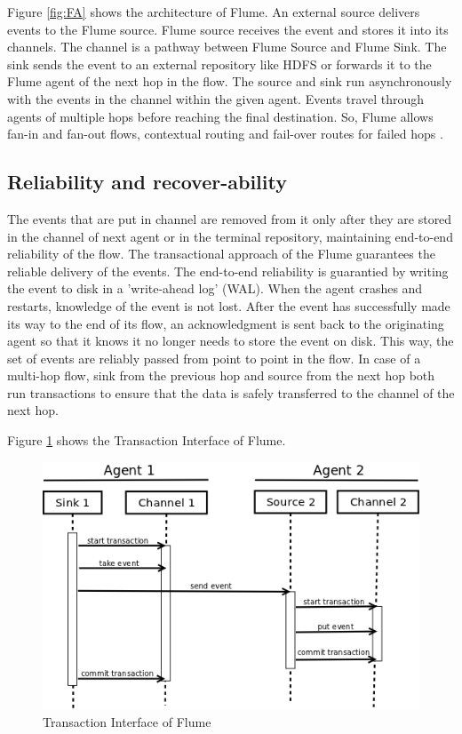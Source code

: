 \documentclass[9pt,twocolumn,twoside]{../../styles/osajnl}
\begin{document}
Figure \ref{fig:FA} shows the architecture of Flume. An external source delivers events to the Flume source. Flume source receives the event and stores it into its channels. The channel is a pathway between Flume Source and Flume Sink. The sink sends the event to an external repository like HDFS or forwards it to the Flume agent of the next hop in the flow. The source and sink run asynchronously with the events in the channel within the given agent. Events travel through agents of multiple hops before reaching the final destination.
So, Flume allows fan-in and fan-out flows, contextual routing and fail-over routes for failed hops  \cite{cloudera}.

\subsection{Reliability and recover-ability}

The events that are put in channel are removed from it only after they are stored in the channel of next agent or in the terminal repository, maintaining end-to-end reliability of the flow. The transactional approach of the Flume guarantees the reliable delivery of the events.
The end-to-end reliability is guarantied by writing the event to disk in a 'write-ahead log' (WAL). When the agent crashes and restarts, knowledge of the event is not lost. After the event has successfully made its way to the end of its flow, an acknowledgment is sent back to the originating agent so that it knows it no longer needs to store the event on disk. This way, the set of events are reliably passed from point to point in the flow. In case of a multi-hop flow, sink from the previous hop and source from the next hop both run transactions to ensure that the data is safely transferred to the channel of the next hop.

Figure \ref{fig:TI} shows the Transaction Interface of Flume.
\begin{figure}[htbp]
\centering
\includegraphics[width=\linewidth]{images/Flume_TI.png}
\caption{Transaction Interface of Flume \cite{dev-manual}}
\label{fig:TI}
\end{figure}
\end{document}
